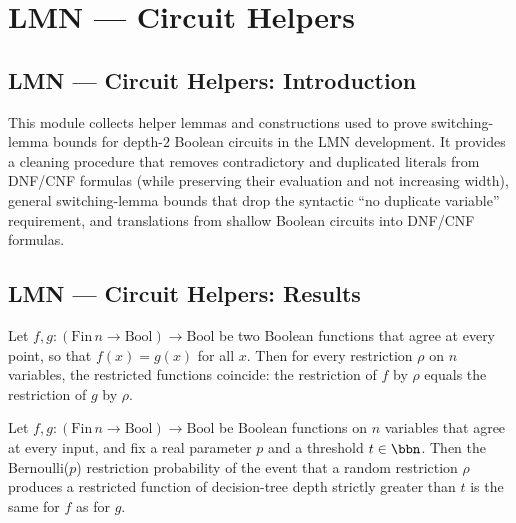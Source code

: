 \section{LMN --- Circuit Helpers}
\subsection*{LMN --- Circuit Helpers: Introduction}

This module collects helper lemmas and constructions used to prove switching-lemma
bounds for depth-$2$ Boolean circuits in the LMN development. It provides a cleaning
procedure that removes contradictory and duplicated literals from DNF/CNF formulas
(while preserving their evaluation and not increasing width), general switching-lemma
bounds that drop the syntactic ``no duplicate variable'' requirement, and translations
from shallow Boolean circuits into DNF/CNF formulas.

\subsection*{LMN --- Circuit Helpers: Results}

\begin{lemma}
\label{LMN.restrictFn_ext'}
\leanok
{}
Let $f, g : (\mathrm{Fin}\,n \to \mathrm{Bool}) \to \mathrm{Bool}$ be two Boolean
functions that agree at every point, so that $f(x) = g(x)$ for all $x$. Then for every
restriction $\rho$ on $n$ variables, the restricted functions coincide: the restriction
of $f$ by $\rho$ equals the restriction of $g$ by $\rho$.
\end{lemma}

\begin{lemma}
\label{LMN.bernoulliRestrProb_congr_fn}
\leanok
{}
Let $f, g : (\mathrm{Fin}\,n \to \mathrm{Bool}) \to \mathrm{Bool}$ be Boolean functions
on $n$ variables that agree at every input, and fix a real parameter $p$ and a threshold
$t \in \bbn$. Then the Bernoulli($p$) restriction probability of the event that a random
restriction $\rho$ produces a restricted function of decision-tree depth strictly
greater than $t$ is the same for $f$ as for $g$.
\end{lemma}

